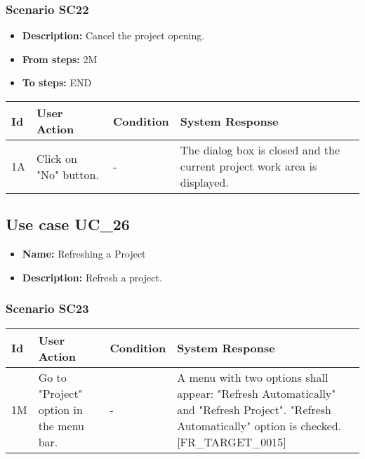 \documentclass[a4paper,11pt]{article}
\newcommand{\bl}{\\ \hline}
\begin{document}
\subsubsection*{Scenario SC22}
\begin{itemize}
\item {\bf Description:} Cancel the project opening.
\item {\bf From steps:} 2M
\item {\bf To steps:} END
\end{itemize}
\begin{tabular}{|p{0.4in}|p{1.5in}|p{1.5in}|p{1.5in}|}
\hline
Id & User Action & Condition & System Response \bl 
1A & Click on "No" button. & - & The dialog box is closed and the current project work
						area is displayed.\bl
\end{tabular}
\subsection*{Use case UC_26}
\begin{itemize}
\item {\bf Name: }Refreshing a Project
\item {\bf Description: }Refresh a project.
\end{itemize}
\subsubsection*{Scenario SC23}
\begin{tabular}{|p{0.4in}|p{1.5in}|p{1.5in}|p{1.5in}|}
\hline
Id & User Action & Condition & System Response \bl 
1M & Go to "Project" option in the menu bar.   & - &  A menu with two options shall appear: "Refresh
						Automatically" and "Refresh Project". "Refresh Automatically"
						option is checked. [FR_TARGET_0015]\bl
\end{tabular}
\end{document}
